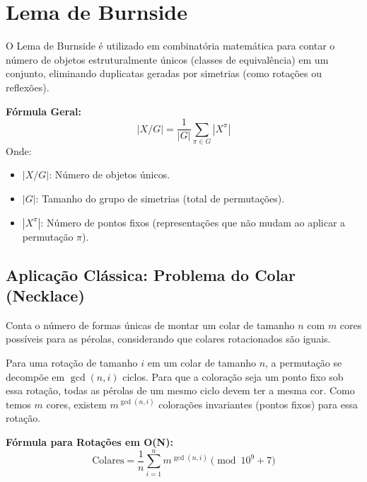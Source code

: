 \section{Lema de Burnside}

O Lema de Burnside é utilizado em combinatória matemática para contar o número de objetos estruturalmente únicos (classes de equivalência) em um conjunto, eliminando duplicatas geradas por simetrias (como rotações ou reflexões).

\textbf{Fórmula Geral:}
$$ |X/G| = \frac{1}{|G|} \sum_{\pi \in G} |X^\pi| $$
Onde:
\begin{itemize}
    \item $|X/G|$: Número de objetos únicos.
    \item $|G|$: Tamanho do grupo de simetrias (total de permutações).
    \item $|X^\pi|$: Número de pontos fixos (representações que não mudam ao aplicar a permutação $\pi$).
\end{itemize}

\subsection*{Aplicação Clássica: Problema do Colar (Necklace)}
Conta o número de formas únicas de montar um colar de tamanho $n$ com $m$ cores possíveis para as pérolas, considerando que colares rotacionados são iguais.

Para uma rotação de tamanho $i$ em um colar de tamanho $n$, a permutação se decompõe em $\gcd(n, i)$ ciclos. Para que a coloração seja um ponto fixo sob essa rotação, todas as pérolas de um mesmo ciclo devem ter a mesma cor. Como temos $m$ cores, existem $m^{\gcd(n, i)}$ colorações invariantes (pontos fixos) para essa rotação.

\textbf{Fórmula para Rotações em O(N):}
$$ \text{Colares} = \frac{1}{n} \sum_{i=1}^{n} m^{\gcd(n, i)} \pmod{10^9+7} $$
